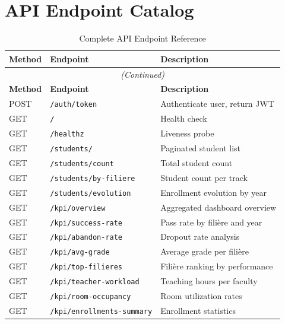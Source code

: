 \documentclass[12pt, a4paper]{report}
\begin{document}
\section{API Endpoint Catalog}

\begin{longtable}{@{}llp{5cm}@{}}
\caption{Complete API Endpoint Reference} \label{tab:api_endpoints} \\
\toprule
\textbf{Method} & \textbf{Endpoint} & \textbf{Description} \\
\midrule
\endfirsthead
\multicolumn{3}{c}{\textit{(Continued)}} \\
\toprule
\textbf{Method} & \textbf{Endpoint} & \textbf{Description} \\
\midrule
\endhead
\bottomrule
\endfoot
POST & \texttt{/auth/token}                & Authenticate user, return JWT \\
GET  & \texttt{/}                           & Health check \\
GET  & \texttt{/healthz}                    & Liveness probe \\
GET  & \texttt{/students/}                  & Paginated student list \\
GET  & \texttt{/students/count}             & Total student count \\
GET  & \texttt{/students/by-filiere}        & Student count per track \\
GET  & \texttt{/students/evolution}         & Enrollment evolution by year \\
GET  & \texttt{/kpi/overview}               & Aggregated dashboard overview \\
GET  & \texttt{/kpi/success-rate}           & Pass rate by filière and year \\
GET  & \texttt{/kpi/abandon-rate}           & Dropout rate analysis \\
GET  & \texttt{/kpi/avg-grade}              & Average grade per filière \\
GET  & \texttt{/kpi/top-filieres}           & Filière ranking by performance \\
GET  & \texttt{/kpi/teacher-workload}       & Teaching hours per faculty \\
GET  & \texttt{/kpi/room-occupancy}         & Room utilization rates \\
GET  & \texttt{/kpi/enrollments-summary}    & Enrollment statistics \\
\end{longtable}

\end{document}

